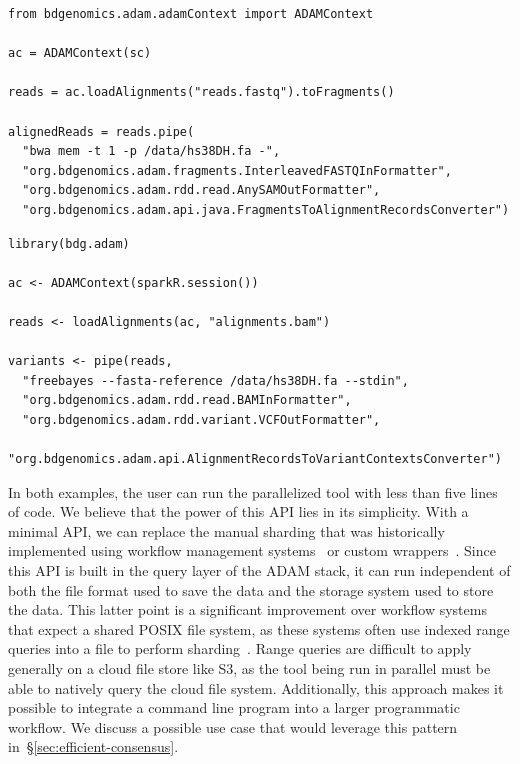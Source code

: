 \documentclass[phd]{ucbthesis}
\begin{document}
\begin{lstlisting}[caption=Calling BWA using the {Python pipe} API, label=lst:pipe-bwa]
from bdgenomics.adam.adamContext import ADAMContext

ac = ADAMContext(sc)

reads = ac.loadAlignments("reads.fastq").toFragments()

alignedReads = reads.pipe(
  "bwa mem -t 1 -p /data/hs38DH.fa -",
  "org.bdgenomics.adam.fragments.InterleavedFASTQInFormatter",
  "org.bdgenomics.adam.rdd.read.AnySAMOutFormatter",
  "org.bdgenomics.adam.api.java.FragmentsToAlignmentRecordsConverter")
\end{lstlisting}

\begin{lstlisting}[caption=Calling {FreeBayes} using the R {pipe} API, label=lst:pipe-freebayes]
library(bdg.adam)

ac <- ADAMContext(sparkR.session())

reads <- loadAlignments(ac, "alignments.bam")

variants <- pipe(reads,
  "freebayes --fasta-reference /data/hs38DH.fa --stdin",
  "org.bdgenomics.adam.rdd.read.BAMInFormatter",
  "org.bdgenomics.adam.rdd.variant.VCFOutFormatter",
  "org.bdgenomics.adam.api.AlignmentRecordsToVariantContextsConverter")
\end{lstlisting}

In both examples, the user can run the parallelized tool with less than five
lines of code. We believe that the power of this API lies in its simplicity.
With a minimal API, we can replace the manual sharding that was historically
implemented using workflow management systems~\cite{depristo11, chiang15} or
custom wrappers~\cite{langmead09crossbow, schatz09, pireddu11, nellore16}. Since this
API is built in the query layer of the {ADAM} stack, it can run
independent of both the file format used to save the data and the storage
system used to store the data. This latter point is a significant improvement
over workflow systems that expect a shared POSIX file system, as these systems
often use indexed range queries into a file to perform sharding~\cite{chiang15}.
Range queries are difficult to apply generally on a cloud file store like S3, as the
tool being run in parallel must be able to natively query the cloud file system.
Additionally, this approach makes it possible to integrate a command line
program into a larger programmatic workflow. We discuss a possible use case that
would leverage this pattern in~\S\ref{sec:efficient-consensus}.
\end{document}
